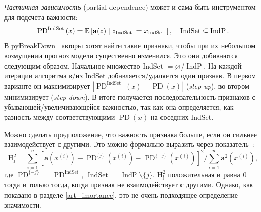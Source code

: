 \documentclass[12pt]{article}
\begin{document}
\emph{Частичная зависимость} (partial dependence) может и сама быть инструментом для подсчета важности:
\begin{equation*}
    \operatorname{PD}^{\text{IndSet}}\left(x\right)=\mathbb{E}\left[\mathbf{a}(z) \mid z_{\text {IndSet }}=x_{\text {IndSet }}\right], \hspace{1.0em} \text{IndSet}	\subseteq  \operatorname{IndP}.
\end{equation*}
В pyBreakDown~\citep{breakDown} авторы хотят найти такие признаки, чтобы при их небольшом возмущении прогноз  модели существенно изменился. Это они добиваются следующим образом. Начальное множество IndSet $= \varnothing$/$\operatorname{IndP}$. На каждой итерации алгоритма в/из IndSet добавляется/удаляется один признак. В первом варианте он максимизирует $\left|\operatorname{PD}^{\text {IndSet }}\left(x\right)-\operatorname{PD}\left(x\right)\right|$ (\emph{step-up}), во втором минимизирует (\emph{step-down}). В итоге получается последовательность признаков с убывающей/увеличивающейся важностью, так как она определяется, как разность между соответствующими $\operatorname{PD}(x)$ на соседних IndSet.

Можно сделать предположение, что важность признака больше, если он сильнее взаимодействует с другими. Это можно формально выразить через показатель~\citep{h2_score}:
\begin{equation*}
    \operatorname{H_{j}^{2}}=\sum_{i=1}^{n}\left[\mathbf{a}\left(x^{(i)}\right)-\operatorname{PD}^{\{j\}}\left(x^{(i)}\right)-\operatorname{PD}^{\{-j\}}\left(x^{(i)}\right)\right]^{2} / \sum_{i=1}^{n} \mathbf{a}^{2}\left(x^{(i)}\right),
\end{equation*}
где $\operatorname{PD}^{\{-j\}}$ = $\operatorname{PD}^{\operatorname{IndSet}}$, $\operatorname{IndSet} = \operatorname{IndP} \setminus \{j\}$.
$\operatorname{H_{j}^{2}}$ положительная и равна 0 тогда и только тогда, когда признак не взаимодействует с другими. Однако, как показано в разделе \ref{art_imortance}, это не очень подходящее определение значимости.
\end{document}
